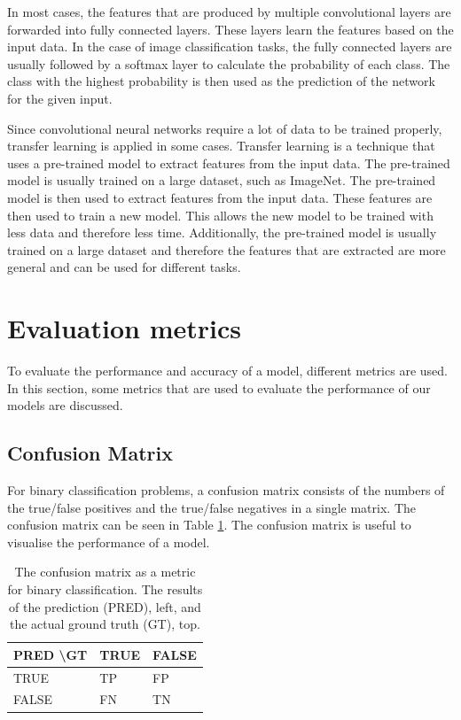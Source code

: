 In most cases, the features that are produced by multiple convolutional layers are forwarded into fully connected layers. These layers learn the features based on the input data. In the case of image classification tasks, the fully connected layers are usually followed by a softmax layer to calculate the probability of each class. The class with the highest probability is then used as the prediction of the network for the given input.

Since convolutional neural networks require a lot of data to be trained properly, transfer learning is applied in some cases. Transfer learning is a technique that uses a pre-trained model to extract features from the input data. The pre-trained model is usually trained on a large dataset, such as ImageNet\cite{ImageNet}. The pre-trained model is then used to extract features from the input data. These features are then used to train a new model. This allows the new model to be trained with less data and therefore less time. Additionally, the pre-trained model is usually trained on a large dataset and therefore the features that are extracted are more general and can be used for different tasks. 

\section{Evaluation metrics}

To evaluate the performance and accuracy of a model, different metrics are used. In this section, some metrics that are used to evaluate the performance of our models are discussed.

\subsection{Confusion Matrix}

For binary classification problems, a confusion matrix consists of the numbers of the true/false positives and the true/false negatives in a single matrix. The confusion matrix can be seen in Table \ref{tab:confusion_matrix}. The confusion matrix is useful to visualise the performance of a model.

\begin{table}[ht]
    \caption[The Confusion Matrix]{The confusion matrix as a metric for binary classification. The results of the prediction (PRED), left, and the actual ground truth (GT), top.}
    \label{tab:confusion_matrix}
    \centering
    \begin{tabular}{l|ll}
    PRED \textbackslash GT & TRUE & FALSE \\ \hline
    TRUE                   & TP   & FP    \\
    FALSE                  & FN   & TN   
    \end{tabular}
\end{table}

